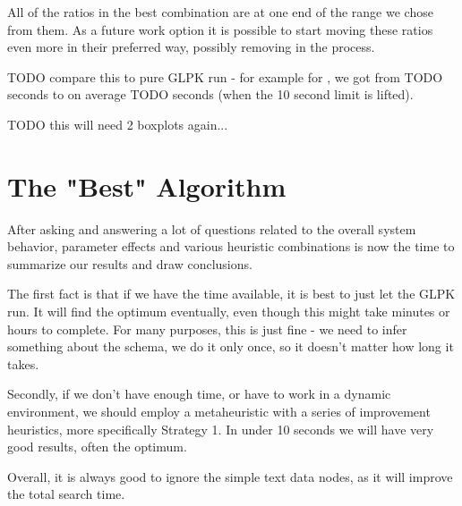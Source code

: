 All of the ratios in the best combination are at one end of the range we chose from them. As a future work option it is possible to start moving these ratios even more in their preferred way, possibly removing  in the process.

TODO compare this to pure GLPK run - for example for , we got from TODO seconds to on average TODO seconds (when the 10 second limit is lifted).

TODO this will need 2 boxplots again...

\section{The "Best" Algorithm}

After asking and answering a lot of questions related to the overall system behavior, parameter effects and various heuristic combinations is now the time to summarize our results and draw conclusions.

The first fact is that if we have the time available, it is best to just let the GLPK run. It will find the optimum eventually, even though this might take minutes or hours to complete. For many purposes, this is just fine - we need to infer something about the schema, we do it only once, so it doesn't matter how long it takes.

Secondly, if we don't have enough time, or have to work in a dynamic environment, we should employ a metaheuristic with a series of improvement heuristics, more specifically Strategy 1. In under 10 seconds we will have very good results, often the optimum.

Overall, it is always good to ignore the simple text data nodes, as it will improve the total search time.




